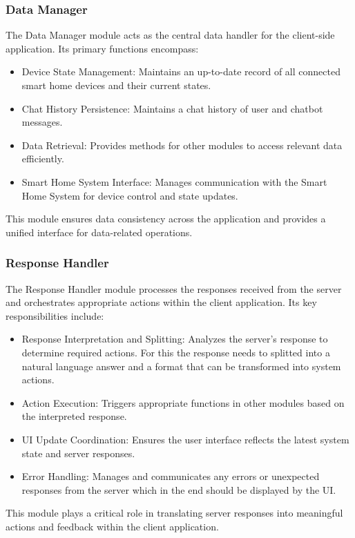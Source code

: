 \subsubsection{Data Manager}
The Data Manager module acts as the central data handler for the client-side application. Its primary functions encompass:
\begin{itemize}
    \item Device State Management: Maintains an up-to-date record of all connected smart home devices and their current states.
    \item Chat History Persistence: Maintains a chat history of user and chatbot messages.
    \item Data Retrieval: Provides methods for other modules to access relevant data efficiently.
    \item Smart Home System Interface: Manages communication with the Smart Home System for device control and state updates.
\end{itemize}
This module ensures data consistency across the application and provides a unified interface for data-related operations.

\subsubsection{Response Handler}
\label{subsec:responsehandler}
The Response Handler module processes the responses received from the server and orchestrates appropriate actions within the client application. Its key responsibilities include:
\begin{itemize}
    \item Response Interpretation and Splitting: Analyzes the server's response to determine required actions. For this the response needs to splitted into a natural language answer and a format that can be transformed into system actions.
    \item Action Execution: Triggers appropriate functions in other modules based on the interpreted response.
    \item UI Update Coordination: Ensures the user interface reflects the latest system state and server responses.
    \item Error Handling: Manages and communicates any errors or unexpected responses from the server which in the end should be displayed by the UI.
\end{itemize}
This module plays a critical role in translating server responses into meaningful actions and feedback within the client application.

